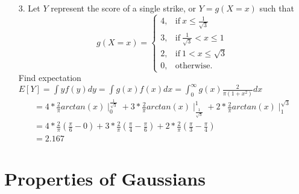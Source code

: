\documentclass[10pt,a4paper]{article}
\begin{document}
\begin{itemize}
  \item[3.] Let $Y$ represent the score of a single strike, or $Y = g(X=x)$ such that
  \begin{equation*}
    g(X=x) = \begin{cases}
            4, & \text{if}~ x\leq \frac{1}{\sqrt{3}} \\
            3, & \text{if}~ \frac{1}{\sqrt{3}} < x \leq 1 \\
            2, & \text{if}~ 1 < x \leq \sqrt{3} \\
            0, & \text{otherwise.}
           \end{cases}
  \end{equation*}
  Find expectation $E[Y] = \int yf(y)dy = \int g(x)f(x)dx = \int_{0}^{\infty}g(x)\frac{2}{\pi (1+x^2)}dx$
  \begin{align*}
    &=4 * \frac{2}{\pi}arctan(x) \mid_{0}^{\frac{1}{\sqrt{3}}} + 3 * \frac{2}{\pi}arctan(x) \mid_{\frac{1}{\sqrt{3}}}^{1} + 2 * \frac{2}{\pi}arctan(x) \mid_{1}^{\sqrt{3}}& \\
    &=4*\frac{2}{\pi}(\frac{\pi}{6} - 0) + 3*\frac{2}{\pi}(\frac{\pi}{4}-\frac{\pi}{6}) + 2*\frac{2}{\pi}(\frac{\pi}{3} - \frac{\pi}{4})& \\
    &= 2.167&
  \end{align*}
\end{itemize}
\pagebreak

\section{Properties of Gaussians}
\end{document}
